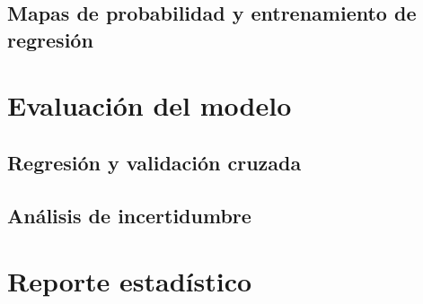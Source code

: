 \subsection{Mapas de probabilidad y entrenamiento de regresión}

\section{Evaluación del modelo}
	\subsection{Regresión y validación cruzada}
	\subsection{Análisis de incertidumbre}


\section{Reporte estadístico}